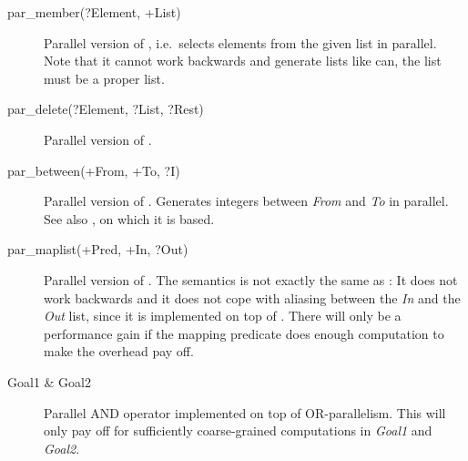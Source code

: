 \begin{description}
\item[par_member(?Element, +List)]
Parallel version of , i.e.\ selects elements from the
given list in parallel. Note that it cannot work backwards and generate
lists like  can, the list must be a proper list.

\item[par_delete(?Element, ?List, ?Rest)]
Parallel version of .

\item[par_between(+From, +To, ?I)]
Parallel version of . Generates integers between {\it From} and
{\it To} in parallel. See also , on which it is based.

\item[par_maplist(+Pred, +In, ?Out)]
Parallel version of .
The semantics is not exactly the same as : It does not work
backwards and it does not cope with aliasing between the {\it In} and
the {\it Out} list, since it is implemented on top of .
There will only be a performance gain if the mapping predicate does
enough computation to make the overhead pay off.

\item[Goal1 \& Goal2]
Parallel AND operator implemented on top of OR-parallelism.
This will only pay off for sufficiently coarse-grained
computations in {\it Goal1} and {\it Goal2}.

\end{description}

